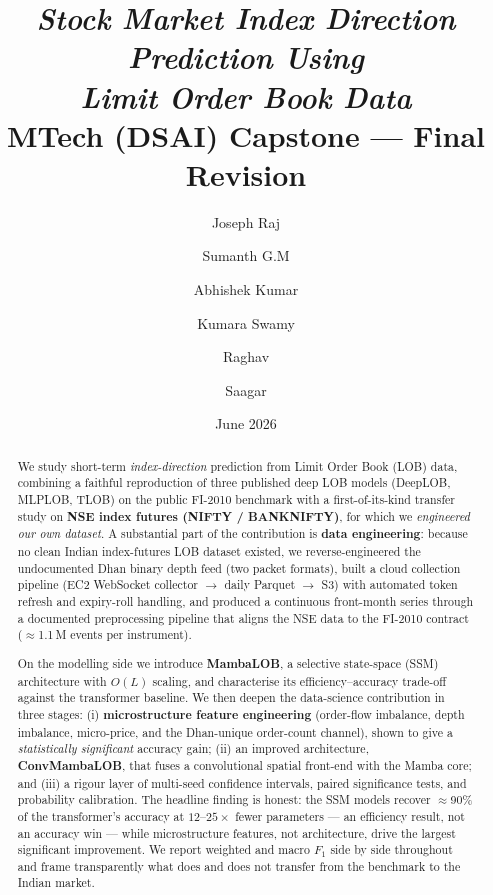 \documentclass[11pt]{article}
\title{\textbf{\textit{Stock Market Index Direction Prediction Using\\ Limit Order Book Data}}\\[4pt]
\large MTech (DSAI) Capstone --- Final Revision}
\author{Joseph Raj \and Sumanth G.M \and Abhishek Kumar \and Kumara Swamy \and Raghav \and Saagar}
\date{June 2026}
\begin{document}
\maketitle
\thispagestyle{empty}

\begin{abstract}
\noindent We study short-term \emph{index-direction} prediction from Limit Order Book (LOB) data, combining
a faithful reproduction of three published deep LOB models (DeepLOB, MLPLOB, TLOB) on the public FI-2010
benchmark with a first-of-its-kind transfer study on \textbf{NSE index futures (NIFTY / BANKNIFTY)}, for
which we \emph{engineered our own dataset}. A substantial part of the contribution is \textbf{data
engineering}: because no clean Indian index-futures LOB dataset existed, we reverse-engineered the
undocumented Dhan binary depth feed (two packet formats), built a cloud collection pipeline
(EC2 WebSocket collector $\rightarrow$ daily Parquet $\rightarrow$ S3) with automated token refresh and
expiry-roll handling, and produced a continuous front-month series through a documented preprocessing
pipeline that aligns the NSE data to the FI-2010 contract ($\approx$1.1\,M events per instrument).

\noindent On the modelling side we introduce \textbf{MambaLOB}, a selective state-space (SSM) architecture
with $O(L)$ scaling, and characterise its efficiency--accuracy trade-off against the transformer baseline. We
then deepen the data-science contribution in three stages: (i) \textbf{microstructure feature engineering}
(order-flow imbalance, depth imbalance, micro-price, and the Dhan-unique order-count channel), shown to give
a \emph{statistically significant} accuracy gain; (ii) an improved architecture, \textbf{ConvMambaLOB}, that
fuses a convolutional spatial front-end with the Mamba core; and (iii) a rigour layer of multi-seed
confidence intervals, paired significance tests, and probability calibration. The headline finding is honest:
the SSM models recover $\approx$90\% of the transformer's accuracy at $12$--$25\times$ fewer parameters --- an
efficiency result, not an accuracy win --- while microstructure features, not architecture, drive the largest
significant improvement. We report weighted and macro $F_1$ side by side throughout and frame transparently
what does and does not transfer from the benchmark to the Indian market.
\end{abstract}

\tableofcontents
\clearpage

\end{document}
